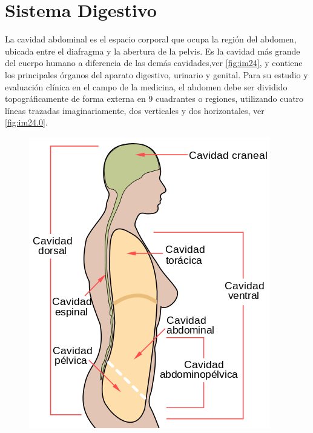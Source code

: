 \section{Sistema Digestivo}
La cavidad abdominal 
es el espacio corporal que ocupa la región del abdomen, ubicada entre el diafragma y la abertura de la pelvis. 
Es la cavidad más grande del cuerpo humano 
a diferencia de las demás cavidades,ver \ref{fig:im24}, y 
contiene los principales órganos del aparato digestivo, urinario y genital.
Para su estudio y evaluación clínica en el campo de la medicina, 
el abdomen debe ser dividido topográficamente de forma externa en 9 
cuadrantes o regiones, utilizando cuatro líneas 
trazadas imaginariamente, dos verticales y dos horizontales, ver \ref{fig:im24.0}.\cite{web12}
\begin{figure}
 \begin{center}
  \includegraphics[width = .3\textwidth]{source/images/image56.png}
 \end{center} 
\end{figure}

